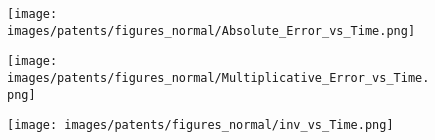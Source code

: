 \begin{figure*}[htbp]
\begin{subfigure}[b]{\textwidth}
	\centering
	\begin{minipage}[b]{0.05\textwidth}
		\centering
	\end{minipage}%
	\begin{minipage}[b]{0.3\textwidth}
		\centering
		\texttt{[image: images/patents/figures\_normal/Absolute\_Error\_vs\_Time.png]} %
		
	\end{minipage}%
	\begin{minipage}[b]{0.3\textwidth}
		\centering
		
		\texttt{[image: images/patents/figures\_normal/Multiplicative\_Error\_vs\_Time.png]} %
		
	\end{minipage}%
	\begin{minipage}[b]{0.3\textwidth}
		\centering
		
		\texttt{[image: images/patents/figures\_normal/inv\_vs\_Time.png]} %
	\end{minipage}
\end{subfigure}
\end{figure*}

